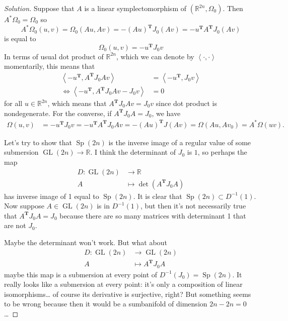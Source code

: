 \begin{proof}[Solution]\leavevmode
	Suppose that $A$ is a linear symplectomorphism of $(\mathbb{R}^{2n},\Omega_0)$. Then $A^{*}\Omega_0=\Omega_0$ so 
	\[A^{*}\Omega_0(u,v) =\Omega_0(Au,Av)=-(Au)^{\mathbf{T}}J_0(Av)=-u^{\mathbf{T}}A^{\mathbf{T}}J_0(Av)\]
is equal to
		\[\Omega_0(u,v)=-u^{\mathbf{T}}J_0v\]
In terms of usual dot product of $\mathbb{R}^{2n}$, which we can denote by $\left<\cdot ,\cdot \right> $ momentarily, this means that
\begin{align*}
	\left<-u^{\mathbf{T}},A^{\mathbf{T}}J_0Av\right> &=\left<-u^{\mathbf{T}},J_0v\right>\\
	\iff\left<-u^{\mathbf{T}},A^{\mathbf{T}}J_0Av-J_0v\right> &=0
\end{align*}
for all $u\in\mathbb{R}^{2n}$, which means that $A^{\mathbf{T}}J_0Av=J_0v$ since dot product is nondegenerate. For the converse, if $A^{\mathbf{T}}J_0A=J_0$, we have
\begin{align*}
	\Omega(u,v)&=-u^{\mathbf{T}}J_0v=-u^{\mathbf{T}}A^{\mathbf{T}}J_0Av=-(Au)^{\mathbf{T}}J(Av)=\Omega(Au,Av_0)=A^*\Omega(uv).
\end{align*}


Let's try to show that $\operatorname{Sp}(2n)$ is the inverse image of a regular value of some submersion $\operatorname{GL}(2n)\to \mathbb{R}$.  I think the determinant of $J_0$ is $1$, so perhaps the map
\begin{align*}
	 D:\operatorname{GL}(2n) &\longrightarrow \mathbb{R} \\
	A &\longmapsto \det (A^{\mathbf{T}}J_0A)
\end{align*}
has inverse image of 1 equal to $\operatorname{Sp}(2n)$. It is clear that $\operatorname{Sp}(2n)\subset D^{-1}(1)$. Now suppose $A\in\operatorname{GL}(2n)$ is in $D^{-1}(1)$, but then it's not necessarily true that $A^{\mathbf{T}}J_0A=J_0$ because there are so many matrices with determinant 1 that are not $J_0$.

Maybe the determinant won't work. But what about
\begin{align*}
	D: \operatorname{GL}(2n) &\longrightarrow \operatorname{GL}(2n) \\
	A &\longmapsto A^{\mathbf{T}}J_0A
\end{align*}
maybe this map is a submersion at every point of $D^{-1}(J_0)=\operatorname{Sp}(2n)$. It really looks like a submersion at every point: it's only a composition of linear isomorphisms… of course its derivative is surjective, right? But something seems to be wrong because then it would be a sumbanifold of dimension $2n-2n=0$…


\end{proof}
